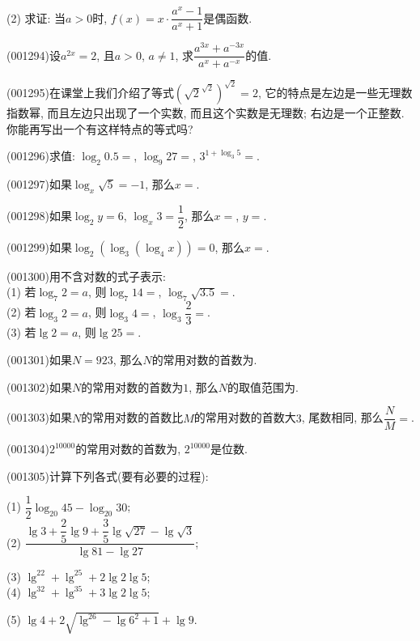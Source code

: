 (2) 求证: 当$a>0$时, $f(x)=x\cdot \dfrac{a^x-1}{a^x+1}$是偶函数.
\item (001294)设$a^{2x}=2$, 且$a>0$, $a \ne 1$, 求$\dfrac{a^{3x}+a^{-3x}}{a^x+a^{-x}}$的值.
\item (001295)在课堂上我们介绍了等式$\left(\sqrt{2}^{\sqrt{2}}\right)^{\sqrt{2}}=2$, 它的特点是左边是一些无理数指数幂, 而且左边只出现了一个实数, 而且这个实数是无理数; 右边是一个正整数. 你能再写出一个有这样特点的等式吗?
\item (001296)求值: $\log_2 0.5=$, $\log_9 27=$, $3^{1+\log_3 5}=$.
\item (001297)如果$\log_x\sqrt{5}=-1$, 那么$x=$.
\item (001298)如果$\log_2 y=6$, $\log_x 3=\dfrac{1}{2}$, 那么$x=$, $y=$.
\item (001299)如果$\log_2(\log_3(\log_4x))=0$, 那么$x=$.
\item (001300)用不含对数的式子表示:\\ 
(1) 若$\log_7 2=a$, 则$\log_7 14=$, $\log_7 \sqrt{3.5}=$.\\ 
(2) 若$\log_3 2=a$, 则$\log_3 4=$, $\log_3 \dfrac{2}{3}=$.\\ 
(3) 若$\lg 2=a$, 则$\lg 25=$.
\item (001301)如果$N=923$, 那么$N$的常用对数的首数为.
\item (001302)如果$N$的常用对数的首数为$1$, 那么$N$的取值范围为.
\item (001303)如果$N$的常用对数的首数比$M$的常用对数的首数大$3$, 尾数相同, 那么$\dfrac{N}{M}=$.
\item (001304)$2^{10000}$的常用对数的首数为, $2^{10000}$是位数.
\item (001305)计算下列各式(要有必要的过程):
\begin{multicols}{2}
(1) $\dfrac{1}{2}\log_{20}45-\log_{20}30$;\\ 
(2) $\dfrac{\lg3+\dfrac{2}{5}\lg9+\dfrac{3}{5}\lg\sqrt{27}-\lg\sqrt{3}}{\lg81-\lg27}$;\\ 
\end{multicols}
\begin{multicols}{2}
(3) $\lg^22+\lg^25+2\lg2\lg5$; \\ 
(4) $\lg^32+\lg^35+3\lg2\lg5$;\hfill\\ 
\end{multicols}
\begin{multicols}{2}
(5) $\lg4+2\sqrt{\lg^26-\lg6^2+1}+\lg9$.\\ 
\end{multicols}
